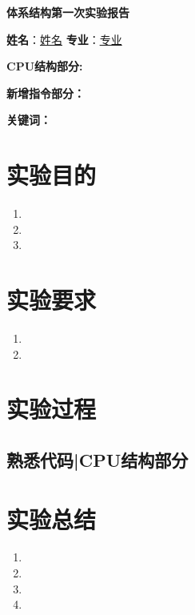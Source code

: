 \documentclass[a4paper]{article}
\begin{document}
\renewcommand{\figurename}{图}
\renewcommand{\contentsname}{目录}  
\renewcommand{\abstractname}{\textbf{\Large 摘要}} 

\begin{center}
    \huge{\textbf{体系结构第一次实验报告}}
\end{center}

\begin{center}
    \textbf{姓名}：\underline{姓名} \quad
    \textbf{专业}：\underline{专业}
\end{center}

\tableofcontents

\vspace*{1cm}


\vspace{1em}

\textbf{CPU结构部分:} 

\textbf{新增指令部分：}

\vspace{1em}
\noindent\textbf{关键词：} 

\newpage

\section{实验目的}

\begin{enumerate}
    \item 
    \item 
    \item 
\end{enumerate}

\section{实验要求}

\begin{enumerate}
    \item 
    \item 
\end{enumerate}

\section{实验过程}

\subsection{熟悉代码|CPU结构部分}





\section{实验总结}

\begin{enumerate}
    \item 
    \item 
    \item 
    \item 
\end{enumerate}

\label{LastPage}
\end{document}
